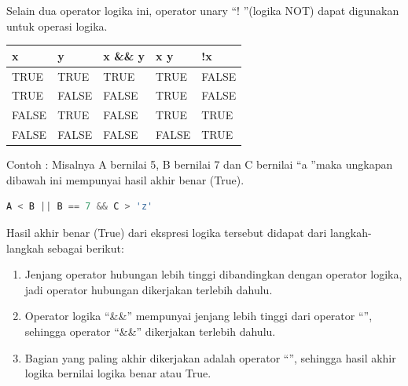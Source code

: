 Selain dua operator logika ini, operator unary \textquotedblleft ! \textquotedblright (logika NOT) dapat digunakan untuk operasi logika.

\begin{longtable}[]{@{}lllll@{}}
\toprule
x & y & x \&\& y & x \texttt{\textbar{}\textbar{}} y & !x\tabularnewline
\midrule
\endhead
TRUE & TRUE & TRUE & TRUE & FALSE\tabularnewline
TRUE & FALSE & FALSE & TRUE & FALSE\tabularnewline
FALSE & TRUE & FALSE & TRUE & TRUE\tabularnewline
FALSE & FALSE & FALSE & FALSE & TRUE\tabularnewline
\bottomrule
\end{longtable}

Contoh : Misalnya A bernilai 5, B bernilai 7 dan C bernilai \textquotedblleft a \textquotedblright maka ungkapan dibawah ini mempunyai hasil akhir benar (True).

\begin{lstlisting}[language=c++, numbers=none]
A < B || B == 7 && C > 'z'
\end{lstlisting}

Hasil akhir benar (True) dari ekspresi logika tersebut didapat dari
langkah-langkah sebagai berikut:

\begin{enumerate}


\item
  Jenjang operator hubungan lebih tinggi dibandingkan dengan operator
  logika, jadi operator hubungan dikerjakan terlebih dahulu.
\item
  Operator logika ``\&\&'' mempunyai jenjang lebih tinggi dari operator
  ``\textbar{}\textbar{}'', sehingga operator ``\&\&'' dikerjakan
  terlebih dahulu.
\item
  Bagian yang paling akhir dikerjakan adalah operator
  ``\textbar{}\textbar{}'', sehingga hasil akhir logika bernilai logika
  benar atau True.
\end{enumerate}


